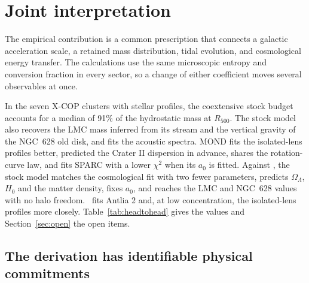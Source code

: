 \section{Joint interpretation}

The empirical contribution is a common prescription that connects a
galactic acceleration scale, a retained mass distribution, tidal evolution,
and cosmological energy transfer. The calculations use the same
microscopic entropy and conversion fraction in every sector, so a change
of either coefficient moves several observables at once.

In the seven X-COP clusters with stellar profiles, the coextensive stock budget accounts for a median of 91\% of the hydrostatic mass at $R_{500}$. The stock model also recovers the LMC mass inferred from its stream and the vertical gravity of the NGC~628 old disk, and fits the acoustic spectra. MOND fits the isolated-lens profiles
better, predicted the Crater II dispersion in advance, shares the
rotation-curve law, and fits SPARC with a lower $\chi^2$ when its $a_0$ is
fitted. Against \LCDM, the stock model matches the cosmological
fit with two fewer parameters, predicts $\Omega_\Lambda$, $H_0$ and the
matter density, fixes $a_0$, and reaches the LMC and NGC~628 values with
no halo freedom. \LCDM\ fits Antlia 2 and, at low concentration, the
isolated-lens profiles more closely. Table~\ref{tab:headtohead} gives the
values and Section~\ref{sec:open} the open items.

\subsection{The derivation has identifiable physical commitments}

